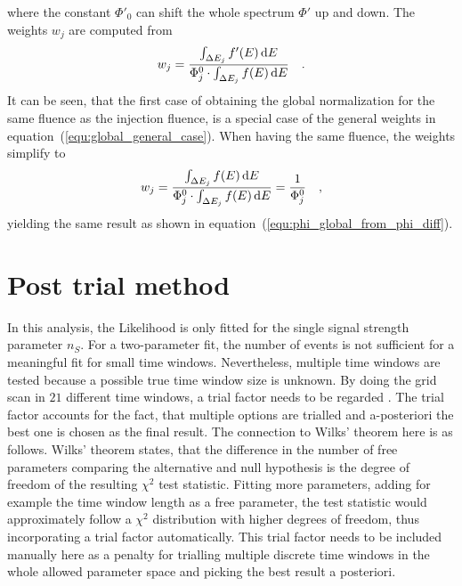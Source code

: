 where the constant $\Phi'_0$ can shift the whole spectrum $\Phi'$ up and down.
The weights $w_j$ are computed from
\begin{equation}
  \label{equ:global_general_case}
  w_j = \frac{\int_{\Delta E_j} f'(E)\,\text{d}E}
             {\Phi_j^0\cdot\int_{\Delta E_j} f(E)\,\text{d}E}
  \quad\text{.}
\end{equation}
It can be seen, that the first case of obtaining the global normalization for the same fluence as the injection fluence, is a special case of the general weights in equation~(\ref{equ:global_general_case}).
When having the same fluence, the weights simplify to
\begin{equation}
  w_j = \frac{\int_{\Delta E_j} f(E)\,\text{d}E}
             {\Phi_j^0\cdot\int_{\Delta E_j} f(E)\,\text{d}E}
    = \frac{1}{\Phi_j^0}
  \quad\text{,}
\end{equation}
yielding the same result as shown in equation~(\ref{equ:phi_global_from_phi_diff}).

\section{Post trial method}
  \label{chp:time_dep_post_trial}
In this analysis, the Likelihood is only fitted for the single signal strength parameter $n_S$.
For a two-parameter fit, the number of events is not sufficient for a meaningful fit for small time windows.
Nevertheless, multiple time windows are tested because a possible true time window size is unknown.
By doing the grid scan in $\num{21}$ different time windows, a trial factor needs to be regarded \cite{Gross:2010qma}.
The trial factor accounts for the fact, that multiple options are trialled and a-posteriori the best one is chosen as the final result.
The connection to Wilks' theorem here is as follows.
Wilks' theorem states, that the difference in the number of free parameters comparing the alternative and null hypothesis is the degree of freedom of the resulting $\chi^2$ test statistic.
Fitting more parameters, adding for example the time window length as a free parameter, the test statistic would approximately follow a $\chi^2$ distribution with higher degrees of freedom, thus incorporating a trial factor automatically.
This trial factor needs to be included manually here as a penalty for trialling multiple discrete time windows in the whole allowed parameter space and picking the best result a posteriori.

